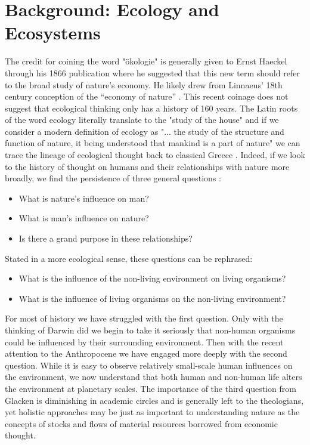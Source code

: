 \section {Background: Ecology and Ecosystems}

The credit for coining the word "ökologie" is generally given to Ernst Haeckel through his 1866 publication where he suggested that this new term should refer to the broad study of nature's economy. He likely drew from Linnaeus’ 18th century conception of the “economy of nature” \cite{worster_1977}. This recent coinage does not suggest that ecological thinking only has a history of 160 years. The Latin roots of the word ecology literally translate to the "study of the house" and if we consider a modern definition of ecology as "... the study of the structure and function of nature, it being understood that mankind is a part of nature" we can trace the lineage of ecological thought back to classical Greece \cite{odum_1953}. Indeed, if we look to the history of thought on humans and their relationships with nature more broadly, we find the persistence of three general questions \cite{glacken_1967}: \begin{itemize} \item What is nature's influence on man? \item What is man's influence on nature? \item Is there a grand purpose in these relationships? \end{itemize} Stated in a more ecological sense, these questions can be rephrased: \begin{itemize} \item What is the influence of the non-living environment on living organisms? \item What is the influence of living organisms on the non-living environment? \end{itemize} For most of history we have struggled with the first question. Only with the thinking of Darwin did we begin to take it seriously that non-human organisms could be influenced by their surrounding environment. Then with the recent attention to the Anthropocene we have engaged more deeply with the second question. While it is easy to observe relatively small-scale human influences on the environment, we now understand that both human and non-human life alters the environment at planetary scales. The importance of the third question from Glacken is diminishing in academic circles and is generally left to the theologians, yet holistic approaches may be just as important to understanding nature as the concepts of stocks and flows of material resources borrowed from economic thought. 

